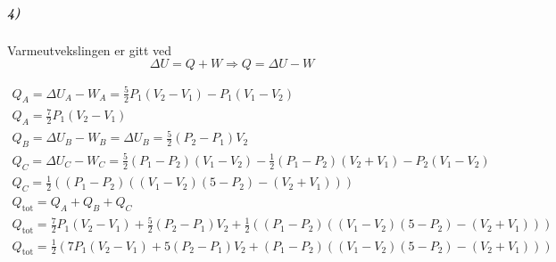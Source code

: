 \documentclass[11pt, A4paper,norsk]{article}
\begin{document}
			\subparagraph{4)}
				\begin{flushleft}
Varmeutvekslingen er gitt ved
$$\Delta U = Q + W \Rightarrow Q = \Delta U - W$$
				\end{flushleft}
				\begin{gather*}
Q_A = \Delta U_A - W_A = \frac{5}{2} P_1 (V_2 - V_1) - P_1 (V_1 - V_2) \\
Q_A = \frac{7}{2} P_1 (V_2 - V_1) \\
Q_B = \Delta U_B - W_B = \Delta U_B = \frac{5}{2} (P_2 - P_1) V_2 \\
Q_C = \Delta U_C - W_C = \frac{5}{2} (P_1 - P_2) (V_1 - V_2) - \frac{1}{2} (P_1 - P_2)(V_2 + V_1) - P_2 (V_1 - V_2) \\
Q_C = \frac{1}{2} \left( (P_1 - P_2) \left( (V_1 - V_2) \left( 5 - P_2 \right) - (V_2 + V_1) \right) \right) \\
Q_{\text{tot}} = Q_A + Q_B + Q_C \\
Q_{\text{tot}} = \frac{7}{2} P_1 (V_2 - V_1) + \frac{5}{2} (P_2 - P_1) V_2 + \frac{1}{2} ( ( P_1 - P_2 ) ( ( V_1 - V_2 ) ( 5 - P_2 ) - ( V_2 + V_1 ) ) ) \\
Q_{\text{tot}} = \frac{1}{2} \left( 7 P_1 (V_2 - V_1) + 5 (P_2 - P_1) V_2 + ( P_1 - P_2 ) ( ( V_1 - V_2 ) ( 5 - P_2 ) - ( V_2 + V_1 ) ) \right)
				\end{gather*}
\end{document}
